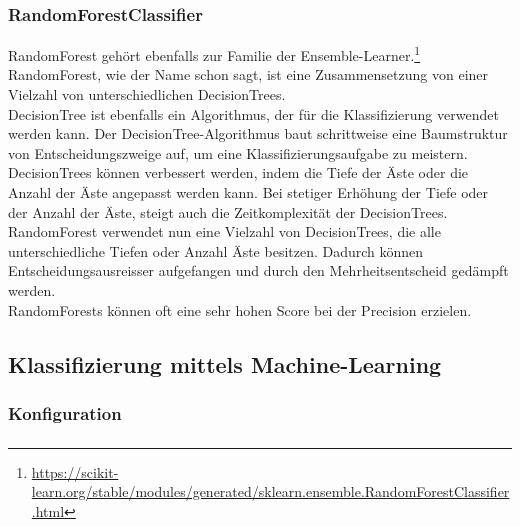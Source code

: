 \subsubsection{RandomForestClassifier}
RandomForest gehört ebenfalls zur Familie der Ensemble-Learner.\footnote{\url{https://scikit-learn.org/stable/modules/generated/sklearn.ensemble.RandomForestClassifier.html}}
RandomForest, wie der Name schon sagt, ist eine Zusammensetzung von einer Vielzahl von unterschiedlichen DecisionTrees.\\
DecisionTree ist ebenfalls ein Algorithmus, der für die Klassifizierung verwendet werden kann.
Der DecisionTree-Algorithmus baut schrittweise eine Baumstruktur von Entscheidungszweige auf, um eine Klassifizierungsaufgabe zu meistern. 
DecisionTrees können verbessert werden, indem die Tiefe der Äste oder die Anzahl der Äste angepasst werden kann.
Bei stetiger Erhöhung der Tiefe oder der Anzahl der Äste, steigt auch die Zeitkomplexität der DecisionTrees.\\
RandomForest verwendet nun eine Vielzahl von DecisionTrees, die alle unterschiedliche Tiefen oder Anzahl Äste besitzen.
Dadurch können Entscheidungsausreisser aufgefangen und durch den Mehrheitsentscheid gedämpft werden.\\
RandomForests können oft eine sehr hohen Score bei der Precision erzielen.
\subsection{Klassifizierung mittels Machine-Learning}
\subsubsection{Konfiguration}
\subsubsection{}

